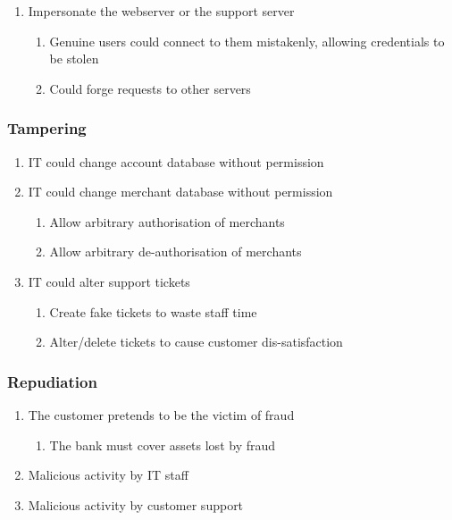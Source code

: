 \begin{enumerate}
    \item \label{impersonateWebserver} Impersonate the webserver or the support server
    \begin{enumerate}
        \item Genuine users could connect to them mistakenly, allowing credentials to be stolen
        \item Could forge requests to other servers
    \end{enumerate}
\end{enumerate}

\subsubsection{Tampering}

\begin{enumerate}[resume]

    \item \label{tamperAccountDatabase} IT could change account database without permission

    \item \label{tamperMerchantDatabase} IT could change merchant database without permission
    \begin{enumerate}
        \item Allow arbitrary authorisation of merchants
        \item Allow arbitrary de-authorisation of merchants
    \end{enumerate}

    \item \label{tamperSupportTickets} IT could alter support tickets
    \begin{enumerate}
        \item Create fake tickets to waste staff time
        \item Alter/delete tickets to cause customer dis-satisfaction
    \end{enumerate}
\end{enumerate}

\subsubsection{Repudiation}

\begin{enumerate}[resume]
    \item \label{repudiationFraud} The customer pretends to be the victim of fraud
    \begin{enumerate}
        \item The bank must cover assets lost by fraud
    \end{enumerate}

    \item \label{repudiationIt} Malicious activity by IT staff
    \item \label{repudiationCustomerSupport} Malicious activity by customer support
\end{enumerate}


